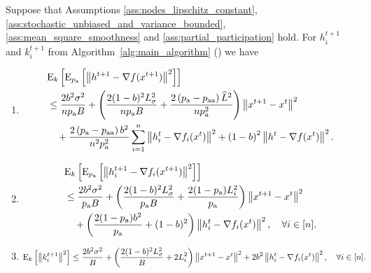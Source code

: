 \documentclass{article}
\newcommand{\algorithmname}{DARIA}
\newcommand*{\probavailable}{\ensuremath{p_{\textnormal{a}}}}
\newcommand*{\probpairaa}{\ensuremath{p_{\textnormal{aa}}}}
\begin{document}
\begin{lemma}
  \label{lemma:gradient_mvr}
  Suppose that Assumptions \ref{ass:nodes_lipschitz_constant}, \ref{ass:stochastic_unbiased_and_variance_bounded}, \ref{ass:mean_square_smoothness} and \ref{ass:partial_participation} hold. For $h^{t+1}_i$ and $k^{t+1}_i$ from Algorithm~\ref{alg:main_algorithm} (\algname{\algorithmname-MVR}) we have
  \begin{enumerate}
  \item
      \begin{align*}
          &\ExpSub{k}{\ExpSub{\probavailable}{\norm{h^{t+1} - \nabla f(x^{t+1})}^2}} \\
          & \leq \frac{2 b^2 \sigma^2}{n \probavailable B} + \left(\frac{2 (1 - b)^2 L_{\sigma}^2}{n \probavailable B} + \frac{2\left(\probavailable - \probpairaa\right) \widehat{L}^2}{n \probavailable^2} \right) \norm{x^{t+1} - x^{t}}^2\\
          &\quad + \frac{2 \left(\probavailable - \probpairaa\right) b^2}{n^2 \probavailable^2} \sum_{i=1}^n \norm{h^t_i - \nabla f_i(x^{t})}^2 + \left(1 - b\right)^2 \norm{h^{t} - \nabla f(x^{t})}^2.
      \end{align*}
  \item
      \begin{align*}
          &\ExpSub{k}{\ExpSub{\probavailable}{\norm{h^{t+1}_i - \nabla f_i(x^{t+1})}^2}} \\
          & \leq \frac{2 b^2 \sigma^2}{\probavailable B}  + \left(\frac{2 (1 - b)^2 L_{\sigma}^2}{\probavailable B} + \frac{2(1 - \probavailable) L_i^2}{\probavailable}\right)\norm{x^{t+1} - x^{t}}^2 \\
          &\quad + \left(\frac{2 (1 - \probavailable) b^2}{\probavailable} + (1 - b)^2\right)\norm{h^t_i - \nabla f_i(x^{t})}^2, \quad \forall i \in [n].
      \end{align*}
  \item
      \begin{align*}
        &{\rm E}_{k}\left[\left\| k^{t+1}_i \right\|^2\right] \leq \frac{2 b^2 \sigma^2}{B} + \left(\frac{2 (1 - b)^2 L_{\sigma}^2}{B} + 2 L_i^2\right)\left\| x^{t+1} - x^{t} \right\|^2 + 2 b^2 \left\| h^t_i - \nabla f_i(x^{t}) \right\|^2, \quad \forall i \in [n].
      \end{align*}
  \end{enumerate}
\end{lemma}
\end{document}
